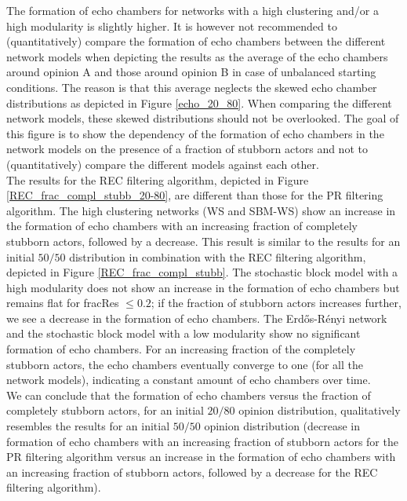 \documentclass[11 pt , letterpaper , twoside , openright]{book}
\begin{document}
\newline
The formation of echo chambers for networks with a high clustering and/or a high modularity is slightly higher. It is however not recommended to (quantitatively) compare the formation of echo chambers between the different network models when depicting the results as the average of the echo chambers around opinion A and those around opinion B in case of unbalanced starting conditions. The reason is that this average neglects the skewed echo chamber distributions as depicted in Figure \ref{echo_20_80}. When comparing the different network models, these skewed distributions should not be overlooked. The goal of this figure is to show the dependency of the formation of echo chambers in the network models on the presence of a fraction of stubborn actors and not to (quantitatively) compare the different models against each other. \\
\newline
The results for the REC filtering algorithm, depicted in Figure \ref{REC_frac_compl_stubb_20-80}, are different than those for the PR filtering algorithm. The high clustering networks (WS and SBM-WS) show an increase in the formation of echo chambers with an increasing fraction of completely stubborn actors, followed by a decrease. This result is similar to the results for an initial $50/50$ distribution in combination with the REC filtering algorithm, depicted in Figure \ref{REC_frac_compl_stubb}. The stochastic block model with a high modularity does not show an increase in the formation of echo chambers but remains flat for fracRes $\leqslant 0.2$; if the fraction of stubborn actors increases further, we see a decrease in the formation of echo chambers. The Erd\H{o}s-R\'{e}nyi network and the stochastic block model with a low modularity show no significant formation of echo chambers. For an increasing fraction of the completely stubborn actors, the echo chambers eventually converge to one (for all the network models), indicating a constant amount of echo chambers over time.\\
\newline
We can conclude that the formation of echo chambers versus the fraction of completely stubborn actors, for an initial $20/80$ opinion distribution, qualitatively resembles the results for an initial $50/50$ opinion distribution (decrease in formation of echo chambers with an increasing fraction of stubborn actors for the PR filtering algorithm versus an increase in the formation of echo chambers with an increasing fraction of stubborn actors, followed by a decrease for the REC filtering algorithm). 
\end{document}
